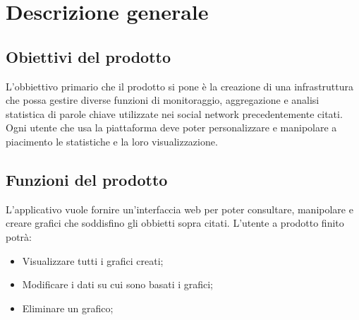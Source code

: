 %


\section{Descrizione generale}

\subsection{Obiettivi del prodotto}
L'obbiettivo primario che il prodotto si pone è la creazione di una infrastruttura che
possa gestire diverse funzioni di monitoraggio, aggregazione e analisi statistica di parole chiave utilizzate nei social network precedentemente citati. Ogni utente che usa la piattaforma deve poter personalizzare e manipolare a piacimento le statistiche e la loro visualizzazione.

\subsection{Funzioni del prodotto}
L'applicativo vuole fornire un'interfaccia web per poter consultare, manipolare e creare grafici che soddisfino gli obbietti sopra citati. L'utente a prodotto finito potrà:

\begin{itemize}
\item Visualizzare tutti i grafici creati;
\item Modificare i dati su cui sono basati i grafici;
\item Eliminare un grafico;
\end{itemize}

